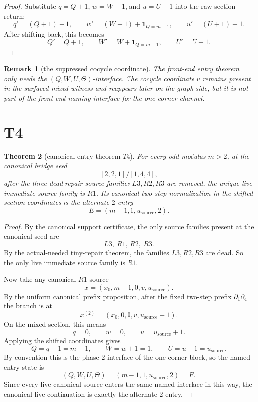 \documentclass[11pt]{article}
\newtheorem{theorem}{Theorem}
\newtheorem{remark}[theorem]{Remark}
\newcommand{\CanSeed}{[2,2,1]/[1,4,4]}
\begin{document}
\begin{proof}
Substitute \(q=Q+1\), \(w=W-1\), and \(u=U+1\) into the raw section return:
\[
q'=(Q+1)+1,
\qquad
w'=(W-1)+\mathbf 1_{Q=m-1},
\qquad
u'=(U+1)+1.
\]
After shifting back, this becomes
\[
Q'=Q+1,\qquad W'=W+\mathbf 1_{Q=m-1},\qquad U'=U+1.
\]
\end{proof}

\begin{remark}[the suppressed cocycle coordinate]
The front-end entry theorem only needs the \((Q,W,U,\Theta)\)-interface.
The cocycle coordinate \(v\) remains present in the surfaced mixed witness and
reappears later on the graph side, but it is not part of the front-end naming
interface for the one-corner channel.
\end{remark}

\section{T4}

\begin{theorem}[canonical entry theorem \(T4\)]
For every odd modulus \(m>2\), at the canonical bridge seed
\[
\CanSeed,
\]
after the three dead repair source families \(L3,R2,R3\) are removed, the
unique live immediate source family is \(R1\).
Its canonical two-step normalization in the shifted section coordinates is the
alternate-\(2\) entry
\[
E=(m-1,1,u_{\mathrm{source}},2).
\]
\end{theorem}

\begin{proof}
By the canonical support certificate, the only source families present at the
canonical seed are
\[
L3,\ R1,\ R2,\ R3.
\]
By the actual-needed tiny-repair theorem, the families \(L3,R2,R3\) are dead.
So the only live immediate source family is \(R1\).

Now take any canonical \(R1\)-source
\[
x=(x_0,m-1,0,v,u_{\mathrm{source}}).
\]
By the uniform canonical prefix proposition, after the fixed two-step prefix
\(\partial_1\partial_4\) the branch is at
\[
x^{(2)}=(x_0,0,0,v,u_{\mathrm{source}}+1).
\]
On the mixed section, this means
\[
q=0,\qquad w=0,\qquad u=u_{\mathrm{source}}+1.
\]
Applying the shifted coordinates gives
\[
Q=q-1=m-1,\qquad
W=w+1=1,\qquad
U=u-1=u_{\mathrm{source}}.
\]
By convention this is the phase-\(2\) interface of the one-corner block, so the
named entry state is
\[
(Q,W,U,\Theta)=(m-1,1,u_{\mathrm{source}},2)=E.
\]
Since every live canonical source enters the same named interface in this way,
the canonical live continuation is exactly the alternate-\(2\) entry.
\end{proof}
\end{document}
